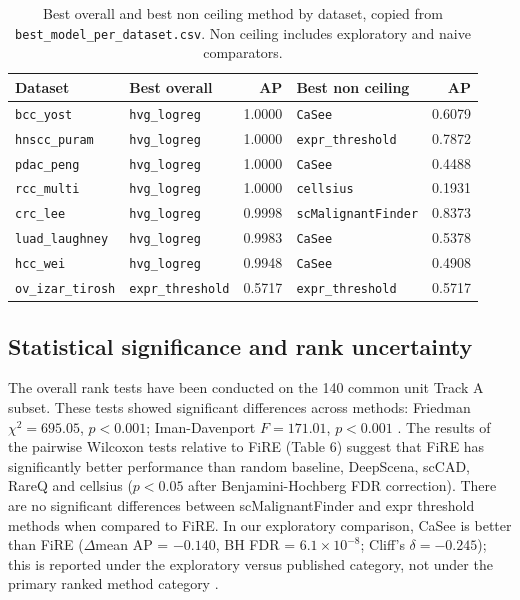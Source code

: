 \documentclass[10pt]{article}
\begin{document}
\begin{table}[H]
\centering
\caption{Best overall and best non ceiling method by dataset, copied
from \texttt{best\_model\_per\_dataset.csv}. Non ceiling includes
exploratory and naive comparators.}
\label{tab:bestdataset}
\small
\begin{tabular}{llrlr}
\toprule
Dataset & Best overall & AP & Best non ceiling & AP \\
\midrule
\texttt{bcc\_yost}        & \texttt{hvg\_logreg}     & 1.0000 & \texttt{CaSee}             & 0.6079 \\
\texttt{hnscc\_puram}     & \texttt{hvg\_logreg}     & 1.0000 & \texttt{expr\_threshold}   & 0.7872 \\
\texttt{pdac\_peng}       & \texttt{hvg\_logreg}     & 1.0000 & \texttt{CaSee}             & 0.4488 \\
\texttt{rcc\_multi}       & \texttt{hvg\_logreg}     & 1.0000 & \texttt{cellsius}          & 0.1931 \\
\texttt{crc\_lee}         & \texttt{hvg\_logreg}     & 0.9998 & \texttt{scMalignantFinder} & 0.8373 \\
\texttt{luad\_laughney}   & \texttt{hvg\_logreg}     & 0.9983 & \texttt{CaSee}             & 0.5378 \\
\texttt{hcc\_wei}         & \texttt{hvg\_logreg}     & 0.9948 & \texttt{CaSee}             & 0.4908 \\
\texttt{ov\_izar\_tirosh} & \texttt{expr\_threshold} & 0.5717 & \texttt{expr\_threshold}   & 0.5717 \\
\bottomrule
\end{tabular}

\end{table}

\subsection{Statistical significance and rank uncertainty}

The overall rank tests have been conducted on the 140 common unit Track A subset. These tests showed significant differences across methods: Friedman $\chi^2 = 695.05$, $p < 0.001$; Iman-Davenport $F = 171.01$, $p < 0.001$ \cite{davis2006relationship,saito2015precision}. The results of the pairwise Wilcoxon tests relative to FiRE (Table 6) suggest that FiRE has significantly better performance than random baseline, DeepScena, scCAD, RareQ and cellsius ($p < 0.05$ after Benjamini-Hochberg FDR correction). There are no significant differences between scMalignantFinder and expr threshold methods when compared to FiRE. In our exploratory comparison, CaSee is better than FiRE ($\Delta$mean AP = $-0.140$, BH FDR = $6.1 \times 10^{-8}$; Cliff’s $\delta = -0.245$); this is reported under the exploratory versus published category, not under the primary ranked method category \cite{sh2022casee}.
\end{document}
